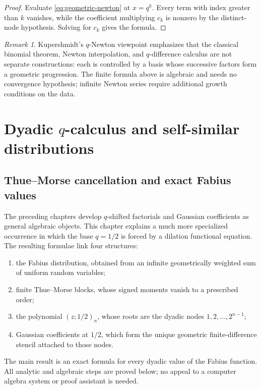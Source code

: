 \documentclass[11pt,oneside,openany]{book}
\theoremstyle{definition}
\theoremstyle{remark}
\newtheorem{remark}[theorem]{Remark}
\begin{document}
\begin{proof}
Evaluate \eqref{eq:geometric-newton} at $x=q^k$.  Every term with index greater than $k$ vanishes, while the coefficient multiplying $c_k$ is nonzero by the distinct-node hypothesis.  Solving for $c_k$ gives the formula.
\end{proof}

\begin{remark}
Kupershmidt's $q$-Newton viewpoint emphasizes that the classical binomial theorem, Newton interpolation, and $q$-difference calculus are not separate constructions: each is controlled by a basis whose successive factors form a geometric progression.  The finite formula above is algebraic and needs no convergence hypothesis; infinite Newton series require additional growth conditions on the data.
\end{remark}

\part{Dyadic \texorpdfstring{$q$}{q}-calculus and self-similar distributions}

\chapter{Thue--Morse cancellation and exact Fabius values}\label{chap:fabius-q}

The preceding chapters develop $q$-shifted factorials and Gaussian
coefficients as general algebraic objects.  This chapter explains a much more
specialized occurrence in which the base $q=1/2$ is forced by a dilation
functional equation.  The resulting formulae link four structures:
\begin{enumerate}
\item the Fabius distribution, obtained from an infinite geometrically weighted
      sum of uniform random variables;
\item finite Thue--Morse blocks, whose signed moments vanish to a prescribed
      order;
\item the polynomial $(z;1/2)_n$, whose roots are the dyadic nodes
      $1,2,\ldots,2^{n-1}$;
\item Gaussian coefficients at $1/2$, which form the unique geometric
      finite-difference stencil attached to those nodes.
\end{enumerate}
The main result is an exact formula for every dyadic value of the Fabius
function.  All analytic and algebraic steps are proved below; no appeal to a
computer algebra system or proof assistant is needed.
\end{document}
